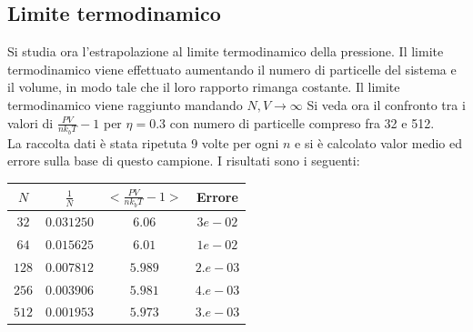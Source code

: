 \subsection{Limite termodinamico}
Si studia ora l'estrapolazione al limite termodinamico della pressione. Il limite termodinamico viene effettuato aumentando il numero di particelle del sistema e il volume, in modo tale che il loro rapporto rimanga costante. Il limite termodinamico viene raggiunto mandando $N,V \rightarrow \infty$
Si veda ora il confronto tra i valori di $\frac{P V}{n k_b T} -1$ per $\eta=0.3$ con numero di particelle compreso fra 32 e 512.\\
La raccolta dati è stata ripetuta 9 volte per ogni $n$ e si è calcolato valor medio ed errore sulla base di questo campione. I risultati sono i seguenti:
\begin{center}
	\begin{tabular}{c c c c}
	\toprule
	$N$ & $\frac{1}{N}$ & $<\frac{P V}{n k_b T} -1> $ & Errore \\
	\midrule
	$32	$	& $0.031250$	&$ 6.06	$	& $3e-02 $\\
	$64	$	& $0.015625$	&$ 6.01	$	& $1e-02 $\\
	$128$	& $0.007812$	&$ 5.989$	& $ 2.e-03 $\\
	$256$	& $0.003906$	&$ 5.981$	& $ 4.e-03$ \\
	$512$	& $0.001953$	&$ 5.973$	& $3.e-03$ \\
	\bottomrule
	\end{tabular}
\end{center}


